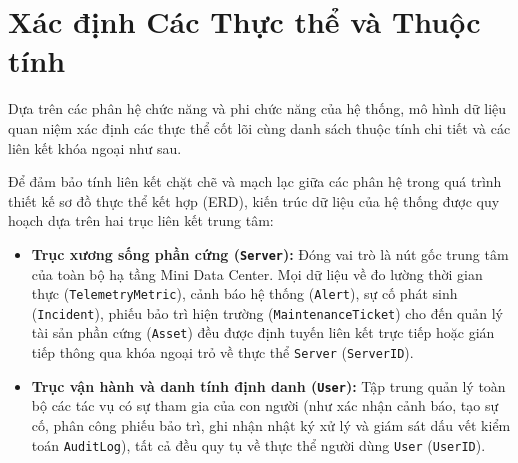 \section{Xác định Các Thực thể và Thuộc tính}
Dựa trên các phân hệ chức năng và phi chức năng của hệ thống, mô hình dữ liệu quan niệm xác định các thực thể cốt lõi cùng danh sách thuộc tính chi tiết và các liên kết khóa ngoại như sau. 

Để đảm bảo tính liên kết chặt chẽ và mạch lạc giữa các phân hệ trong quá trình thiết kế sơ đồ thực thể kết hợp (ERD), kiến trúc dữ liệu của hệ thống được quy hoạch dựa trên hai trục liên kết trung tâm:
\begin{itemize}[leftmargin=2em]
    \item \textbf{Trục xương sống phần cứng (\texttt{Server}):} Đóng vai trò là nút gốc trung tâm của toàn bộ hạ tầng Mini Data Center. Mọi dữ liệu về đo lường thời gian thực (\texttt{TelemetryMetric}), cảnh báo hệ thống (\texttt{Alert}), sự cố phát sinh (\texttt{Incident}), phiếu bảo trì hiện trường (\texttt{MaintenanceTicket}) cho đến quản lý tài sản phần cứng (\texttt{Asset}) đều được định tuyến liên kết trực tiếp hoặc gián tiếp thông qua khóa ngoại trỏ về thực thể \texttt{Server} (\texttt{ServerID}).
    \item \textbf{Trục vận hành và danh tính định danh (\texttt{User}):} Tập trung quản lý toàn bộ các tác vụ có sự tham gia của con người (như xác nhận cảnh báo, tạo sự cố, phân công phiếu bảo trì, ghi nhận nhật ký xử lý và giám sát dấu vết kiểm toán \texttt{AuditLog}), tất cả đều quy tụ về thực thể người dùng \texttt{User} (\texttt{UserID}).
\end{itemize}


